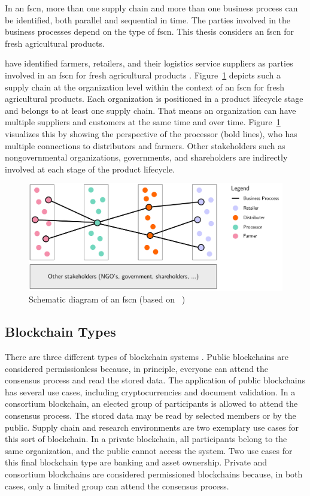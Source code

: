 \documentclass[conference]{IEEEtran}
\begin{document}
In an \ac{fscn}, more than one supply chain and more than one business process can be identified, both parallel and sequential in time. The parties involved in the business processes depend on the type of \ac{fscn}. This thesis considers an \ac{fscn} for fresh agricultural products.  

\citeauthor{van2005innovations} have identified farmers, retailers, and their logistics service suppliers as parties involved in an \ac{fscn} for fresh agricultural products \cite{van2005innovations}. Figure~\ref{fig:food_supply_network} depicts such a supply chain at the organization level within the context of an \ac{fscn} for fresh agricultural products. Each organization is positioned in a product lifecycle stage and belongs to at least one supply chain. That means an organization can have multiple suppliers and customers at the same time and over time. Figure~\ref{fig:food_supply_network} visualizes this by showing the perspective of the processor (bold lines), who has multiple connections to distributors and farmers. Other stakeholders such as nongovernmental organizations, governments, and shareholders are indirectly involved at each stage of the product lifecycle.

\begin{figure}[ht]
    \centering
    \includegraphics[page=1,scale=0.23]{fscn}
	\caption{Schematic diagram of an \ac{fscn} (based on \citeauthor{van2005innovations}~\cite{van2005innovations})}
	\label{fig:food_supply_network}
\end{figure}

\subsection{Blockchain Types} \label{s:blockchain_types}
There are three different types of blockchain systems \cite{zheng2017overview}. Public blockchains are considered permissionless because, in principle, everyone can attend the consensus process and read the stored data. The application of public blockchains has several use cases, including cryptocurrencies and document validation. In a consortium blockchain, an elected group of participants is allowed to attend the consensus process. The stored data may be read by selected members or by the public. Supply chain and research environments are two exemplary use cases for this sort of blockchain. In a private blockchain, all participants belong to the same organization, and the public cannot access the system. Two use cases for this final blockchain type are banking and asset ownership. Private and consortium blockchains are considered permissioned blockchains because, in both cases, only a limited group can attend the consensus process.
\end{document}
